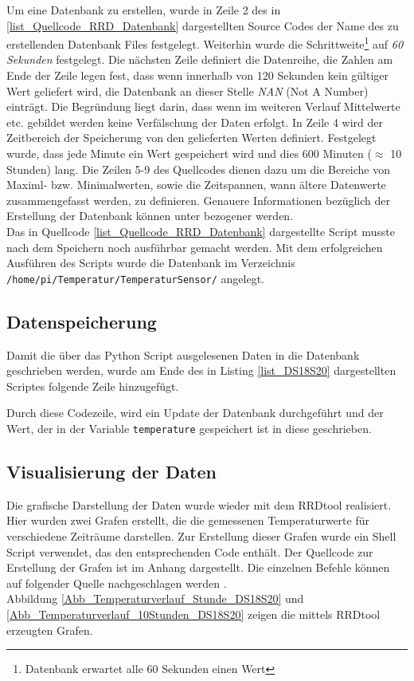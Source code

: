 Um eine Datenbank zu erstellen, wurde in Zeile 2 des in \ref{list_Quellcode_RRD_Datenbank} dargestellten Source Codes der Name des zu erstellenden Datenbank Files festgelegt. Weiterhin wurde die Schrittweite\footnote{Datenbank erwartet alle 60 Sekunden einen Wert} auf \textit{60 Sekunden} festgelegt. Die nächsten Zeile definiert die Datenreihe, die Zahlen am Ende der Zeile legen fest, dass wenn innerhalb von 120 Sekunden kein gültiger Wert geliefert wird, die Datenbank an dieser Stelle \textit{NAN} (Not A Number) einträgt. Die Begründung liegt darin, dass wenn im weiteren Verlauf Mittelwerte etc. gebildet werden keine Verfälschung der Daten erfolgt. In Zeile 4 wird der Zeitbereich der Speicherung von den gelieferten Werten definiert. Festgelegt wurde, dass jede Minute ein Wert gespeichert wird und dies 600 Minuten ($\approx$ 10 Stunden) lang.  Die Zeilen 5-9 des Quellcodes dienen dazu um die Bereiche von Maximl- bzw. Minimalwerten, sowie die Zeitspannen, wann ältere Datenwerte zusammengefasst werden, zu definieren. Genauere Informationen bezüglich der Erstellung der Datenbank können unter  \citep{Hompage_RRDtool} bezogener  werden.\\
Das in Quellcode \ref{list_Quellcode_RRD_Datenbank} dargestellte Script musste nach dem Speichern noch ausführbar gemacht werden.  Mit dem erfolgreichen Ausführen des Scripts wurde die Datenbank im Verzeichnis \texttt{/home/pi/Temperatur/TemperaturSensor/} angelegt.

\subsection*{Datenspeicherung}
\label{subsection_Speicherung der Daten des DS18S20}
Damit die über das Python Script ausgelesenen Daten in die Datenbank geschrieben werden, wurde am Ende des in Listing \ref{list_DS18S20} dargestellten Scriptes folgende Zeile hinzugefügt.



Durch diese Codezeile, wird ein Update der Datenbank durchgeführt und der Wert, der in der Variable \texttt{temperature} gespeichert ist in diese geschrieben.
\newpage

\subsection{Visualisierung der Daten}
\label{subsection_Visualisieren der Daten DS18S20}
Die grafische Darstellung der Daten wurde wieder mit dem RRDtool realisiert. Hier wurden zwei Grafen erstellt, die die gemessenen Temperaturwerte für verschiedene Zeiträume darstellen. Zur Erstellung dieser Grafen wurde ein Shell Script verwendet, das den entsprechenden Code enthält. Der Quellcode zur Erstellung der Grafen ist im Anhang dargestellt. Die einzelnen Befehle können auf folgender Quelle nachgeschlagen werden \citep{Hompage_RRDtool}.
\\Abbildung \ref{Abb_Temperaturverlauf_Stunde_DS18S20} und \ref{Abb_Temperaturverlauf_10Stunden_DS18S20} zeigen die mittels RRDtool erzeugten Grafen.

